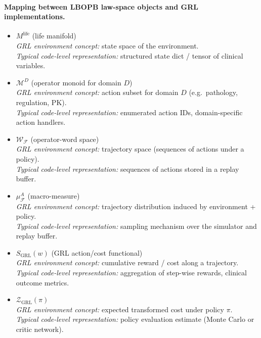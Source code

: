 \documentclass[11pt]{book}
\theoremstyle{plain}
\theoremstyle{definition}
\theoremstyle{remark}
\begin{document}
\paragraph{Mapping between LBOPB law-space objects and GRL implementations.}
\begin{itemize}
  \item $M^{\mathrm{life}}$ (life manifold)\\
        \emph{GRL environment concept:} state space of the environment.\\
        \emph{Typical code-level representation:} structured state dict /
        tensor of clinical variables.
  \item $\mathcal{M}^{D}$ (operator monoid for domain $D$)\\
        \emph{GRL environment concept:} action subset for domain $D$
        (e.g.\ pathology, regulation, PK).\\
        \emph{Typical code-level representation:} enumerated action IDs,
        domain-specific action handlers.
  \item $\mathcal{W}_{\mathcal{F}}$ (operator-word space)\\
        \emph{GRL environment concept:} trajectory space (sequences of
        actions under a policy).\\
        \emph{Typical code-level representation:} sequences of actions
        stored in a replay buffer.
  \item $\mu_{\mathcal{F}}^A$ (macro-measure)\\
        \emph{GRL environment concept:} trajectory distribution induced
        by environment + policy.\\
        \emph{Typical code-level representation:} sampling mechanism over
        the simulator and replay buffer.
  \item $S_{\mathrm{GRL}}(w)$ (GRL action/cost functional)\\
        \emph{GRL environment concept:} cumulative reward / cost along a
        trajectory.\\
        \emph{Typical code-level representation:} aggregation of
        step-wise rewards, clinical outcome metrics.
  \item $\mathcal{Z}_{\mathrm{GRL}}(\pi)$\\
        \emph{GRL environment concept:} expected transformed cost under
        policy $\pi$.\\
        \emph{Typical code-level representation:} policy evaluation
        estimate (Monte Carlo or critic network).
\end{itemize}
\end{document}
